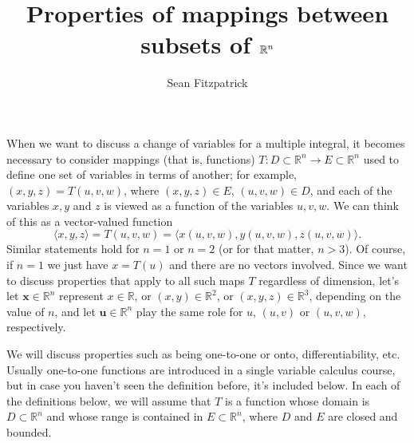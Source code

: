 \documentclass[12pt,letterpaper]{article}
\title{Properties of mappings between subsets of $\R^n$}
\author{Sean Fitzpatrick}
\newcommand{\R}{\mathbb{R}}
\newcommand{\x}{\mathbf{x}}
\newcommand{\uu}{\mathbf{u}}
\begin{document}
\maketitle

When we want to discuss a change of variables for a multiple integral, it becomes necessary to consider mappings (that is, functions) $T:D\subset \R^n\to E\subset \R^n$ used to define one set of variables in terms of another; for example, $(x,y,z) = T(u,v,w)$, where $(x,y,z)\in E$, $(u,v,w)\in D$, and each of the variables $x,y$ and $z$ is viewed as a function of the variables $u,v,w$. We can think of this as a vector-valued function
\[
\langle x,y,z\rangle = T(u,v,w) = \langle x(u,v,w),y(u,v,w),z(u,v,w)\rangle.
\]
Similar statements hold for $n=1$ or $n=2$ (or for that matter, $n>3$). Of course, if $n=1$ we just have $x=T(u)$ and there are no vectors involved. Since we want to discuss properties that apply to all such maps $T$ regardless of dimension, let's let $\x\in \R^n$ represent $x\in \R$, or $(x,y)\in \R^2$, or $(x,y,z)\in \R^3$, depending on the value of $n$, and let $\uu\in\R^n$ play the same role for $u$, $(u,v)$ or $(u,v,w)$, respectively.

We will discuss properties such as being one-to-one or onto, differentiability, etc. Usually one-to-one functions are introduced in a single variable calculus course, but in case you haven't seen the definition before, it's included below. In each of the definitions below, we will assume that $T$ is a function whose domain is $D\subset \R^n$ and whose range is contained in $E\subset \R^n$, where $D$ and $E$ are closed and bounded.
\end{document}
